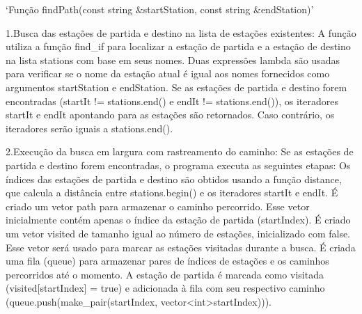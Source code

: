 `Função findPath(const string &startStation, const string &endStation)'

1.Busca das estações de partida e destino na lista de estações existentes:
A função utiliza a função find_if para localizar a estação de partida e a estação de destino na lista stations com base em seus nomes. Duas expressões lambda são usadas para verificar se o nome da estação atual é igual aos nomes fornecidos como argumentos startStation e endStation.
Se as estações de partida e destino forem encontradas (startIt != stations.end() e endIt != stations.end()), os iteradores startIt e endIt apontando para as estações são retornados. Caso contrário, os iteradores serão iguais a stations.end().

2.Execução da busca em largura com rastreamento do caminho:
Se as estações de partida e destino forem encontradas, o programa executa as seguintes etapas:
Os índices das estações de partida e destino são obtidos usando a função distance, que calcula a distância entre stations.begin() e os iteradores startIt e endIt.
É criado um vetor path para armazenar o caminho percorrido. Esse vetor inicialmente contém apenas o índice da estação de partida (startIndex).
É criado um vetor visited de tamanho igual ao número de estações, inicializado com false. Esse vetor será usado para marcar as estações visitadas durante a busca.
É criada uma fila (queue) para armazenar pares de índices de estações e os caminhos percorridos até o momento.
A estação de partida é marcada como visitada (visited[startIndex] = true) e adicionada à fila com seu respectivo caminho (queue.push(make_pair(startIndex, vector<int>{startIndex}))).

